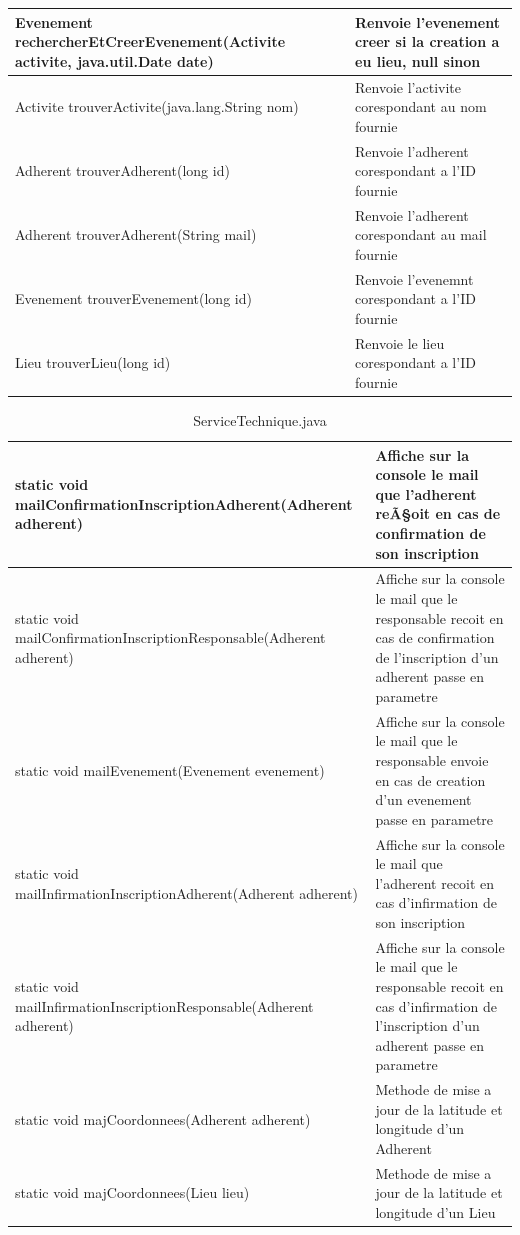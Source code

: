 \documentclass[a4paper,11pt]{article}
\begin{document}
\begin{table}[H]
\begin{center}
\begin{longtable}{|P{7cm}|p{7cm}|}
       Evenement rechercherEtCreerEvenement(Activite activite, java.util.Date date) & Renvoie l'evenement creer si la creation a eu lieu, null sinon  \\ \hline
       Activite trouverActivite(java.lang.String nom) & Renvoie l'activite corespondant au nom fournie  \\ \hline
       Adherent trouverAdherent(long id) & Renvoie l'adherent corespondant a l'ID fournie  \\ \hline
       Adherent trouverAdherent(String mail) & Renvoie l'adherent corespondant au mail fournie  \\ \hline
       Evenement trouverEvenement(long id) & Renvoie l'evenemnt corespondant a l'ID fournie  \\ \hline
       Lieu trouverLieu(long id) & Renvoie le lieu corespondant a l'ID fournie \\ \hline
    \end{longtable}
  \end{center}
\end{table}

\begin{table}[H]
  \caption{ServiceTechnique.java}
  \label{tab:ServiceTechnique}

  \begin{center}
    \begin{tabular}{|P{7cm}|p{7cm}|}
    \hline
       static void mailConfirmationInscriptionAdherent(Adherent adherent) & Affiche sur la console le mail que l'adherent reÃ§oit en cas de confirmation de son inscription \\ \hline
       static void mailConfirmationInscriptionResponsable(Adherent adherent) & Affiche sur la console le mail que le responsable recoit en cas de confirmation de l'inscription d'un adherent passe en parametre \\ \hline
       static void mailEvenement(Evenement evenement) & Affiche sur la console le mail que le responsable envoie en cas de creation d'un evenement passe en parametre \\ \hline
static void mailInfirmationInscriptionAdherent(Adherent adherent) & Affiche sur la console le mail que l'adherent recoit en cas d'infirmation de son inscription \\ \hline
static void mailInfirmationInscriptionResponsable(Adherent adherent) & Affiche sur la console le mail que le responsable recoit en cas d'infirmation de l'inscription d'un adherent passe en parametre \\ \hline
static void majCoordonnees(Adherent adherent) & Methode de mise a jour de la latitude et longitude d'un Adherent \\ \hline
static void majCoordonnees(Lieu lieu) & Methode de mise a jour de la latitude et longitude d'un Lieu \\ \hline
    \end{tabular}
  \end{center}
\end{table}
\end{document}
